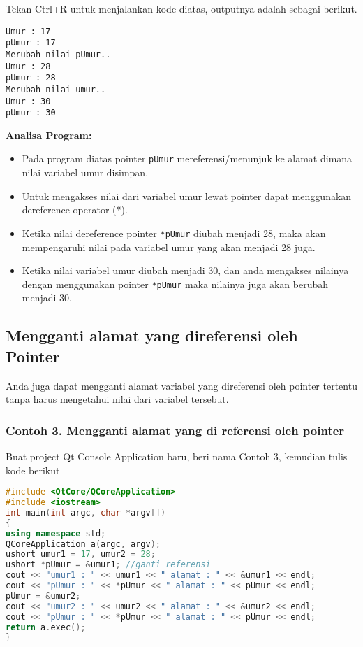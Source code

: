 Tekan Ctrl+R untuk menjalankan kode diatas, outputnya adalah sebagai
berikut.

\begin{verbatim}
Umur : 17
pUmur : 17
Merubah nilai pUmur..
Umur : 28
pUmur : 28
Merubah nilai umur..
Umur : 30
pUmur : 30
\end{verbatim}

\textbf{Analisa Program:}

\begin{itemize}
\tightlist
\item
  Pada program diatas pointer \texttt{pUmur} mereferensi/menunjuk ke
  alamat dimana nilai variabel umur disimpan.
\item
  Untuk mengakses nilai dari variabel umur lewat pointer dapat
  menggunakan dereference operator (*).
\item
  Ketika nilai dereference pointer \texttt{*pUmur} diubah menjadi 28,
  maka akan mempengaruhi nilai pada variabel umur yang akan menjadi 28
  juga.
\item
  Ketika nilai variabel umur diubah menjadi 30, dan anda mengakses
  nilainya dengan menggunakan pointer \texttt{*pUmur} maka nilainya juga
  akan berubah menjadi 30.
\end{itemize}

\subsection{Mengganti alamat yang direferensi oleh
Pointer}\label{mengganti-alamat-yang-direferensi-oleh-pointer}

Anda juga dapat mengganti alamat variabel yang direferensi oleh pointer
tertentu tanpa harus mengetahui nilai dari variabel tersebut.

\subsubsection*{Contoh 3. Mengganti alamat yang di referensi oleh pointer}

Buat project Qt Console Application baru, beri nama Contoh 3, kemudian
tulis kode berikut

\begin{lstlisting}[language=c++]
#include <QtCore/QCoreApplication>
#include <iostream>
int main(int argc, char *argv[])
{
using namespace std;
QCoreApplication a(argc, argv);
ushort umur1 = 17, umur2 = 28;
ushort *pUmur = &umur1; //ganti referensi
cout << "umur1 : " << umur1 << " alamat : " << &umur1 << endl;
cout << "pUmur : " << *pUmur << " alamat : " << pUmur << endl;
pUmur = &umur2;
cout << "umur2 : " << umur2 << " alamat : " << &umur2 << endl;
cout << "pUmur : " << *pUmur << " alamat : " << pUmur << endl;
return a.exec();
}
\end{lstlisting}

